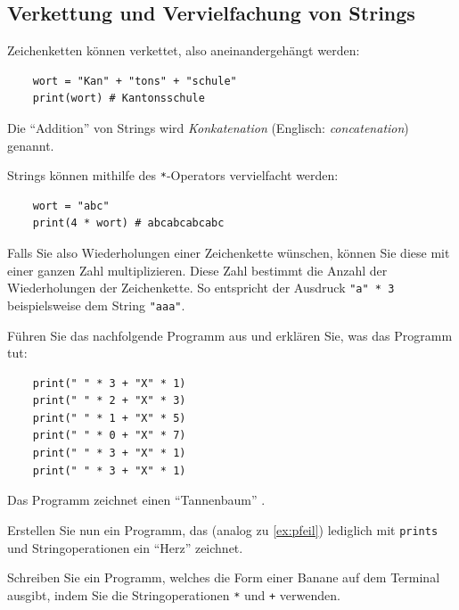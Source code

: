 \subsection{Verkettung und Vervielfachung von Strings}
Zeichenketten können verkettet, also aneinandergehängt werden:
\begin{lstlisting}
	wort = "Kan" + "tons" + "schule"
	print(wort) # Kantonsschule
\end{lstlisting}
Die \enquote{Addition} von Strings wird \emph{Konkatenation} (Englisch: \emph{concatenation}) genannt.

Strings können mithilfe des \lstinline{*}-Operators vervielfacht werden:
\begin{lstlisting}
	wort = "abc"
	print(4 * wort) # abcabcabcabc
\end{lstlisting}
Falls Sie also Wiederholungen einer Zeichenkette wünschen, können Sie diese mit einer ganzen Zahl multiplizieren. Diese Zahl bestimmt die Anzahl der Wiederholungen der Zeichenkette. So entspricht der Ausdruck \lstinline|"a" * 3| beispielsweise dem String \lstinline|"aaa"|.

\begin{myexercise}\label{ex:pfeil}
	Führen Sie das nachfolgende Programm aus und erklären Sie, was das Programm tut:
	\begin{lstlisting}
	print(" " * 3 + "X" * 1)
	print(" " * 2 + "X" * 3)
	print(" " * 1 + "X" * 5)
	print(" " * 0 + "X" * 7)
	print(" " * 3 + "X" * 1)
	print(" " * 3 + "X" * 1)
  \end{lstlisting}
	\begin{myanswer}
		Das Programm zeichnet einen \enquote{Tannenbaum} .
	\end{myanswer}
\end{myexercise}

\begin{myexercise}\label{ex:herz}
	Erstellen Sie nun ein Programm, das (analog zu \cref{ex:pfeil}) lediglich mit \lstinline|prints| und Stringoperationen ein \enquote{Herz}  zeichnet.
	\begin{myanswer}
		
	\end{myanswer}
\end{myexercise}

\begin{mychallenge}
	Schreiben Sie ein Programm, welches die Form einer Banane auf dem Terminal ausgibt, indem Sie die Stringoperationen \lstinline|*| und \lstinline|+| verwenden.
	\begin{myanswer}
		
	\end{myanswer}
\end{mychallenge}

